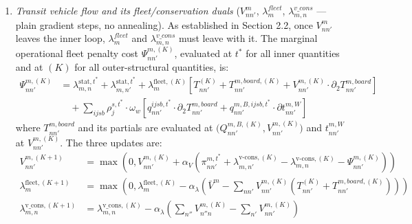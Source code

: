 \documentclass[11pt,a4paper]{article}
\newcommand{\Proj}[1]{\max\left(0, #1\right)}
\begin{document}
\begin{enumerate}
\begin{enumerate}
\begin{enumerate}
            \item \emph{Transit vehicle flow and its fleet/conservation duals} ($V^m_{nn'}$, $\lambda^{fleet}_m$, $\lambda^{v\_cons}_{m,n}$ — plain gradient steps, no annealing). As established in Section 2.2, once $V^m_{nn'}$ leaves the inner loop, $\lambda^{fleet}_m$ and $\lambda^{v\_cons}_{m,n}$ must leave with it. The marginal operational fleet penalty cost $\Psi_{nn'}^{m,(K)}$, evaluated at $t^*$ for all inner quantities and at $(K)$ for all outer-structural quantities, is:
            \begin{align}
                \Psi_{nn'}^{m,(K)} &= \lambda^{\text{stat},t^*}_{m,n} + \lambda^{\text{stat},t^*}_{m,n'} + \lambda^{\text{fleet},(K)}_m \left[ T_{nn'}^{(K)} + T^{m,board,(K)}_{nn'} + V^{m,(K)}_{nn'} \cdot \partial_2 T^{m,board}_{nn'} \right] \nonumber \\
                &\quad + \sum_{ijsb} \rho^{s,t^*}_j \cdot \omega_w \left[ q^{ijsb,t^*}_{nn'} \cdot \partial_2 T^{m,board}_{nn'} + q^{m,B,ijsb,t^*}_{nn'} \cdot \partial t^{m,W}_{nn'} \right]
            \end{align}
            where $T^{m,board}_{nn'}$ and its partials are evaluated at $\big(Q_{nn'}^{m,B,(K)}, V_{nn'}^{m,(K)}\big)$ and $t^{m,W}_{nn'}$ at $V_{nn'}^{m,(K)}$. The three updates are:
            \begin{align}
                V_{nn'}^{m,(K+1)} &= \Proj{ V_{nn'}^{m,(K)} + \alpha_V \left( \pi^{m,t^*}_{nn'} + \lambda^{\text{v-cons},(K)}_{m,n'} - \lambda^{\text{v-cons},(K)}_{m,n} - \Psi_{nn'}^{m,(K)} \right) } \\
                \lambda^{\text{fleet}, (K+1)}_m &= \Proj{ \lambda^{\text{fleet},(K)}_m - \alpha_{\lambda} \left( \bar{V}^m - \sum_{nn'} V_{nn'}^{m,(K)} \left( T_{nn'}^{(K)} + T^{m,board,(K)}_{nn'} \right) \right) } \\
                \lambda^{\text{v\_cons}, (K+1)}_{m,n} &= \lambda^{\text{v\_cons},(K)}_{m,n} - \alpha_{\lambda} \left( \sum_{n''} V_{n''n}^{m,(K)} - \sum_{n'} V_{nn'}^{m,(K)} \right)
            \end{align}
        \end{enumerate}


\end{enumerate}
\end{enumerate}
\end{document}

